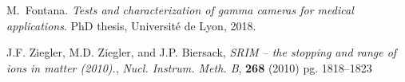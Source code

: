 \documentclass[a4paper,11pt]{article}
\begin{document}
\begin{thebibliography}{99}
M.~Fontana.
\newblock \emph{{Tests and characterization of gamma cameras for medical
  applications}}.
\newblock Ph{D} thesis, {Universit{\'e} de Lyon}, 2018.

J.F. Ziegler, M.D. Ziegler, and J.P. Biersack, \emph{{SRIM} – the stopping and range of ions in matter (2010).}, \emph{Nucl. Instrum. Meth. B}, \textbf{268} (2010) pg. 1818--1823

\end{thebibliography}
\end{document}
